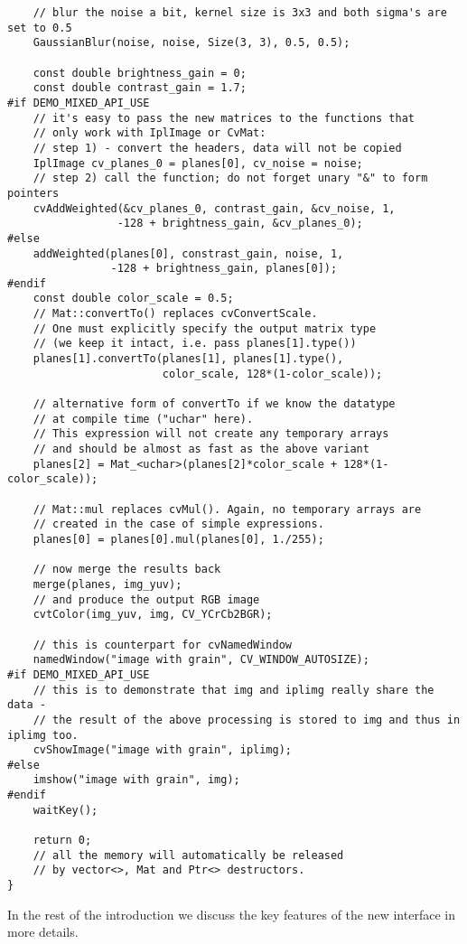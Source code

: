 \begin{lstlisting}
    // blur the noise a bit, kernel size is 3x3 and both sigma's are set to 0.5
    GaussianBlur(noise, noise, Size(3, 3), 0.5, 0.5);

    const double brightness_gain = 0;
    const double contrast_gain = 1.7;
#if DEMO_MIXED_API_USE
    // it's easy to pass the new matrices to the functions that
    // only work with IplImage or CvMat:
    // step 1) - convert the headers, data will not be copied
    IplImage cv_planes_0 = planes[0], cv_noise = noise;
    // step 2) call the function; do not forget unary "&" to form pointers
    cvAddWeighted(&cv_planes_0, contrast_gain, &cv_noise, 1,
                 -128 + brightness_gain, &cv_planes_0);
#else
    addWeighted(planes[0], constrast_gain, noise, 1,
                -128 + brightness_gain, planes[0]);
#endif
    const double color_scale = 0.5;
    // Mat::convertTo() replaces cvConvertScale.
    // One must explicitly specify the output matrix type
    // (we keep it intact, i.e. pass planes[1].type())
    planes[1].convertTo(planes[1], planes[1].type(),
                        color_scale, 128*(1-color_scale));

    // alternative form of convertTo if we know the datatype
    // at compile time ("uchar" here).
    // This expression will not create any temporary arrays
    // and should be almost as fast as the above variant
    planes[2] = Mat_<uchar>(planes[2]*color_scale + 128*(1-color_scale));

    // Mat::mul replaces cvMul(). Again, no temporary arrays are
    // created in the case of simple expressions.
    planes[0] = planes[0].mul(planes[0], 1./255);

    // now merge the results back
    merge(planes, img_yuv);
    // and produce the output RGB image
    cvtColor(img_yuv, img, CV_YCrCb2BGR);

    // this is counterpart for cvNamedWindow
    namedWindow("image with grain", CV_WINDOW_AUTOSIZE);
#if DEMO_MIXED_API_USE
    // this is to demonstrate that img and iplimg really share the data -
    // the result of the above processing is stored to img and thus in iplimg too.
    cvShowImage("image with grain", iplimg);
#else
    imshow("image with grain", img);
#endif
    waitKey();

    return 0;
    // all the memory will automatically be released
    // by vector<>, Mat and Ptr<> destructors.
}
\end{lstlisting}

In the rest of the introduction we discuss the key features of the new interface in more details.

